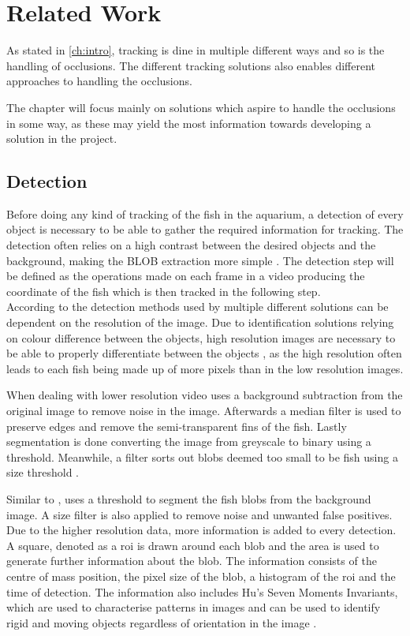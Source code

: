 \graphicspath{{figures/research/}}
\chapter{Related Work}\label{ch:related}
As stated in \autoref{ch:intro}, tracking is dine in multiple different ways and so is the handling of occlusions. The different tracking solutions also enables different approaches to handling the occlusions.

The chapter will focus mainly on solutions which aspire to handle the occlusions in some way, as these may yield the most information towards developing a solution in the project.

\section{Detection}
Before doing any kind of tracking of the fish in the aquarium, a detection of every object is necessary to be able to gather the required information for tracking. The detection often relies on a high contrast between the desired objects and the background, making the BLOB extraction more simple \citep{Delcourt2018}. The detection step will be defined as the operations made on each frame in a video producing the coordinate of the fish which is then tracked in the following step.\\

According to \cite{Delcourt2018} the detection methods used by multiple different solutions can be dependent on the resolution of the image. Due to identification solutions relying on colour difference between the objects, high resolution images are necessary to be able to properly differentiate between the objects \citep{idtracker2014, Feijo2018, Romero-Ferrero2019}, as the high resolution often leads to each fish being made up of more pixels than in the low resolution images.

When dealing with lower resolution video \cite{Dolado2015} uses a background subtraction from the original image to remove noise in the image. Afterwards a median filter is used to preserve edges and remove the semi-transparent fins of the fish. Lastly segmentation is done converting the image from greyscale to binary using a threshold. Meanwhile, a filter sorts out \gls{blob}s deemed too small to be fish using a size threshold \citep{Dolado2015}.

Similar to \cite{Dolado2015}, \cite{Rodriguez2017} uses a threshold to segment the fish \gls{blob}s from the background image. A size filter is also applied to remove noise and unwanted false positives. Due to the higher resolution data, more information is added to every detection. A square, denoted as a \gls{roi} is drawn around each \gls{blob} and the area is used to generate further information about the \gls{blob}. The information consists of the centre of mass position, the pixel size of the \gls{blob}, a histogram of the \gls{roi} and the time of detection. The information also includes Hu's Seven Moments Invariants, which are used to characterise patterns in images and can be used to identify rigid and moving objects regardless of orientation in the image \citep{Rodriguez2017}.

